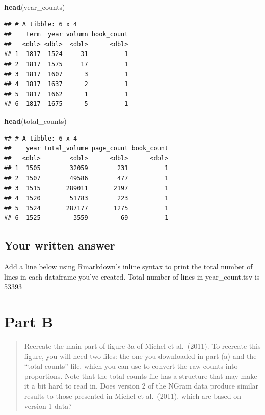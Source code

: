 \documentclass[
]{article}
\newenvironment{Shaded}{\begin{snugshade}}{\end{snugshade}}
\newcommand{\KeywordTok}[1]{\textcolor[rgb]{0.13,0.29,0.53}{\textbf{#1}}}
\newcommand{\NormalTok}[1]{#1}
\begin{document}
\begin{Shaded}
\begin{Highlighting}[]
\KeywordTok{head}\NormalTok{(year_counts)}
\end{Highlighting}
\end{Shaded}

\begin{verbatim}
## # A tibble: 6 x 4
##    term  year volumn book_count
##   <dbl> <dbl>  <dbl>      <dbl>
## 1  1817  1524     31          1
## 2  1817  1575     17          1
## 3  1817  1607      3          1
## 4  1817  1637      2          1
## 5  1817  1662      1          1
## 6  1817  1675      5          1
\end{verbatim}

\begin{Shaded}
\begin{Highlighting}[]
\KeywordTok{head}\NormalTok{(total_counts)}
\end{Highlighting}
\end{Shaded}

\begin{verbatim}
## # A tibble: 6 x 4
##    year total_volume page_count book_count
##   <dbl>        <dbl>      <dbl>      <dbl>
## 1  1505        32059        231          1
## 2  1507        49586        477          1
## 3  1515       289011       2197          1
## 4  1520        51783        223          1
## 5  1524       287177       1275          1
## 6  1525         3559         69          1
\end{verbatim}

\hypertarget{your-written-answer}{%
\subsection{Your written answer}\label{your-written-answer}}

Add a line below using Rmarkdown's inline syntax to print the total
number of lines in each dataframe you've created. Total number of lines
in year\_count.tsv is 53393

\hypertarget{part-b}{%
\section{Part B}\label{part-b}}

\begin{quote}
Recreate the main part of figure 3a of Michel et al.~(2011). To recreate
this figure, you will need two files: the one you downloaded in part (a)
and the ``total counts'' file, which you can use to convert the raw
counts into proportions. Note that the total counts file has a structure
that may make it a bit hard to read in. Does version 2 of the NGram data
produce similar results to those presented in Michel et al.~(2011),
which are based on version 1 data?
\end{quote}
\end{document}
